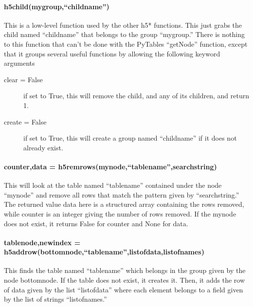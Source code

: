 \paragraph{h5child(mygroup,``childname'')}
This is a low-level function used by the other h5* functions.
This just grabs the child named ``childname'' that belongs
    to the group ``mygroup.''
There is nothing to this function that can't be done with
    the PyTables ``getNode'' function,
    except that it groups several useful functions
    by allowing the following keyword arguments
    \begin{mykwargs}
        \begin{description}
            \item[clear = False] if set to True, this will remove
                the child, and any of its children, and return 1.
            \item[create = False] if set to True, this will create
                a group named ``childname'' if it does not already exist.
        \end{description}
    \end{mykwargs}
\paragraph{counter,data = h5remrows(mynode,``tablename'',searchstring)}
This will look at the table named ``tablename'' contained
    under the node ``mynode'' and remove all rows that match
    the pattern given by ``searchstring.''
The returned value data here is a structured array containing
    the rows removed, while counter is an integer giving the
    number of rows removed.
If the mynode does not exist, it returns False for counter
    and None for data.
\paragraph{tablenode,newindex = h5addrow(bottomnode,``tablename'',listofdata,listofnames)}
This finds the table named ``tablename'' which belongs
    in the group given by the node bottomnode.
If the table does not exist, it creates it.
Then, it adds the row of data given by
    the list ``listofdata''
    where each element belongs to a field given by
    the list of strings
    ``listofnames.''

